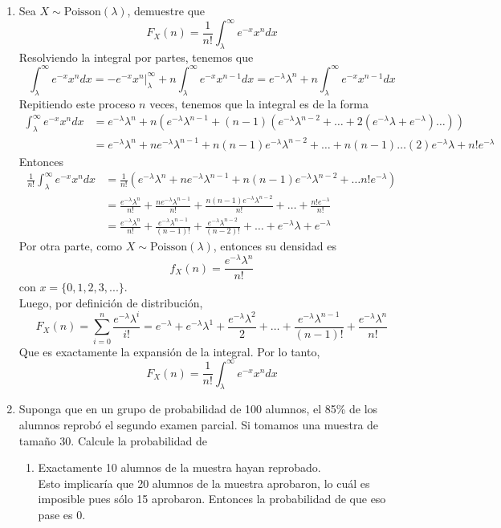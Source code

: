 \documentclass[11pt,a4paper]{report}
\begin{document}
	\begin{enumerate}
		\item{
			Sea $X\sim\text{Poisson}(\lambda)$, demuestre que
            \[F_X(n) = \frac{1}{n!}\int_{\lambda}^{\infty}e^{-x}x^n dx\]
			Resolviendo la integral por partes, tenemos que
			\[\int_{\lambda}^{\infty}e^{-x}x^n dx
			= -e^{-x}x^n \Big|_{\lambda}^{\infty}+
			n\int_{\lambda}^{\infty}{e^{-x}x^{n-1}dx}
			= e^{-\lambda}\lambda^n + n\int_{\lambda}^{\infty}{e^{-x}x^{n-1}dx}\]
			Repitiendo este proceso $n$ veces, tenemos que la integral es de la
			forma
			\begin{align*}
				\int_{\lambda}^{\infty}e^{-x}x^n dx
				&= e^{-\lambda}\lambda^n + n(e^{-\lambda}\lambda^{n-1} +
				(n-1)(e^{-\lambda}\lambda^{n-2} + \dots + 2(e^{-\lambda}\lambda +
				e^{-\lambda})\dots))\\
				&= e^{-\lambda}\lambda^n + ne^{-\lambda}\lambda^{n-1} +
				n(n-1)e^{-\lambda}\lambda^{n-2} + \dots
				+ n(n-1)\dots(2)e^{-\lambda}\lambda + n!e^{-\lambda}
			\end{align*}
			Entonces
			\begin{align*}
				\frac{1}{n!}\int_{\lambda}^{\infty}e^{-x}x^n dx
				&= \frac{1}{n!}(e^{-\lambda}\lambda^n + ne^{-\lambda}\lambda^{n-1} +
				n(n-1)e^{-\lambda}\lambda^{n-2} + \dots n!e^{-\lambda} )\\
				&= \frac{e^{-\lambda}\lambda^n}{n!} + \frac{ne^{-\lambda}\lambda^{n-1}}{n!}
				+ \frac{n(n-1)e^{-\lambda}\lambda^{n-2}}{n!} + \dots +
				\frac{n!e^{-\lambda}}{n!}\\
				&= \frac{e^{-\lambda}\lambda^n}{n!} +
				\frac{e^{-\lambda}\lambda^{n-1}}{(n-1)!} +
				\frac{e^{-\lambda}\lambda^{n-2}}{(n-2)!} + \dots +
				e^{-\lambda}\lambda + e^{-\lambda}
			\end{align*}
			Por otra parte, como $X\sim\text{Poisson}(\lambda)$, entonces
			su densidad es
			\[f_X(n) = \frac{e^{-\lambda}\lambda^{n}}{n!}\]
			con $x = \{0, 1, 2, 3, ...\}$.\\
			Luego, por definición de distribución,
			\[F_X(n) = \sum_{i=0}^{n}{\frac{e^{-\lambda}\lambda^{i}}{i!}}
			= e^{-\lambda} + e^{-\lambda}\lambda^{1} + \frac{e^{-\lambda}\lambda^{2}}{2}
			+ \dots  + \frac{e^{-\lambda}\lambda^{n-1}}{(n-1)!} +
			\frac{e^{-\lambda}\lambda^n}{n!}\]
			Que es exactamente la expansión de la integral. Por lo tanto,
			\[F_X(n) = \frac{1}{n!}\int_{\lambda}^{\infty}e^{-x}x^n dx\]
		}

		\item{
			Suponga que en un grupo de probabilidad de 100 alumnos, el 85\% de
            los alumnos reprobó el segundo examen parcial. Si tomamos una
            muestra de tamaño 30. Calcule la probabilidad de
            \begin{enumerate}
                \item {
                	Exactamente 10 alumnos de la muestra hayan reprobado.\\
					Esto implicaría que 20 alumnos de la muestra aprobaron,
					lo cuál es imposible pues sólo 15 aprobaron.
					Entonces la probabilidad de que eso pase es 0.
                }


\end{enumerate}}
\end{enumerate}
\end{document}

